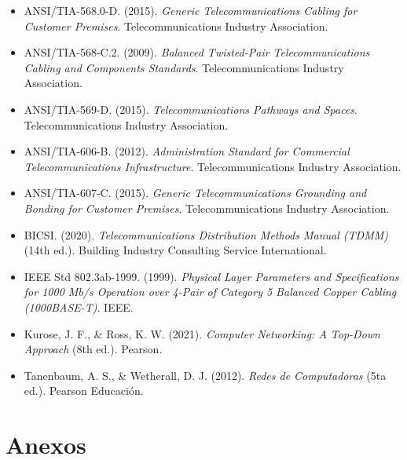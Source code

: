 \documentclass[11pt,a4paper]{article}
\begin{document}
\begin{itemize}[noitemsep, leftmargin=*]
    \item ANSI/TIA-568.0-D. (2015). \textit{Generic Telecommunications Cabling for Customer Premises}. Telecommunications Industry Association.
    \item ANSI/TIA-568-C.2. (2009). \textit{Balanced Twisted-Pair Telecommunications Cabling and Components Standards}. Telecommunications Industry Association.
    \item ANSI/TIA-569-D. (2015). \textit{Telecommunications Pathways and Spaces}. Telecommunications Industry Association.
    \item ANSI/TIA-606-B. (2012). \textit{Administration Standard for Commercial Telecommunications Infrastructure}. Telecommunications Industry Association.
    \item ANSI/TIA-607-C. (2015). \textit{Generic Telecommunications Grounding and Bonding for Customer Premises}. Telecommunications Industry Association.
    \item BICSI. (2020). \textit{Telecommunications Distribution Methods Manual (TDMM)} (14th ed.). Building Industry Consulting Service International.
    \item IEEE Std 802.3ab-1999. (1999). \textit{Physical Layer Parameters and Specifications for 1000 Mb/s Operation over 4-Pair of Category 5 Balanced Copper Cabling (1000BASE-T)}. IEEE.
    \item Kurose, J. F., \& Ross, K. W. (2021). \textit{Computer Networking: A Top-Down Approach} (8th ed.). Pearson.
    \item Tanenbaum, A. S., \& Wetherall, D. J. (2012). \textit{Redes de Computadoras} (5ta ed.). Pearson Educación.
\end{itemize}

\section{Anexos}
\end{document}
